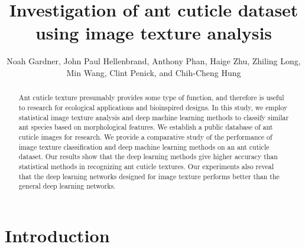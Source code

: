 \documentclass{aci}
\numberwithin{equation}{section}
\begin{document}
\title{Investigation of ant cuticle dataset using image texture
    analysis}

\author{%
    Noah Gardner,
    John Paul Hellenbrand,
    Anthony Phan,
    Haige Zhu,
    Zhiling Long,
    Min Wang,
    Clint Penick,
    and Chih-Cheng Hung\corrauth
}%


\address{%
}


\begin{abstract}
    Ant cuticle texture presumably provides some type of function, and therefore
    is useful to research for ecological applications and bioinspired designs.
    In this study, we employ statistical image texture analysis and deep machine
    learning methods to classify similar ant species based on morphological
    features. We establish a public database of ant cuticle images for research.
    We provide a comparative study of the performance of image texture
    classification and deep machine learning methods on an ant cuticle dataset.
    Our results show that the deep learning methods give higher accuracy than
    statistical methods in recognizing ant cuticle textures. Our experiments
    also reveal that the deep learning networks designed for image texture
    performs better than the general deep learning networks.
\end{abstract}
\maketitle

\section{Introduction}
\end{document}
